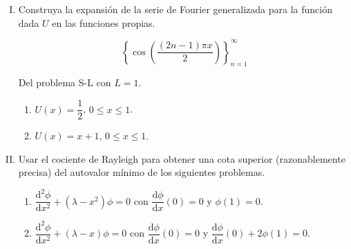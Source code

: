 \documentclass[fleqn]{article}
\newcommand{\despar}[3]{\dfrac{\mathrm{d}^#1 #2}{\mathrm{d} #3^#1}}
\newcommand{\depar}[2]{\dfrac{\mathrm{d} #1}{\mathrm{d} #2}}
\begin{document}
\begin{enumerate}[I.]
		\item Construya la expansión de la serie de Fourier generalizada para la función dada $U$ en las funciones propias.
		
		\begin{equation*}
			\left\lbrace \cos \left( \dfrac{(2n - 1) \pi x}{2} \right) \right\rbrace_{n=1}^{\infty}
		\end{equation*}

		Del problema S-L con $ L = 1 $.
		
		\begin{enumerate}
			\item $ U(x) = \dfrac{1}{2} $, $ 0 \leq x \leq 1 $.
			\item $ U(x) = x + 1 $, $ 0 \leq x \leq 1 $.
		\end{enumerate}
		
		\item Usar el cociente de Rayleigh para obtener una cota superior (razonablemente precisa) del autovalor mínimo de los siguientes problemas.
		
		\begin{enumerate}
			\item $ \despar{2}{\phi}{x} + (\lambda - x^2) \phi = 0 $ con $ \depar{\phi}{x} (0) = 0 $ y $ \phi (1) = 0 $.
			\item $ \despar{2}{\phi}{x} + (\lambda - x) \phi = 0 $ con $ \depar{\phi}{x} (0) = 0 $ y $ \depar{\phi}{x} (0) + 2 \phi (1) = 0 $.
		\end{enumerate}
	\end{enumerate}
\end{document}
